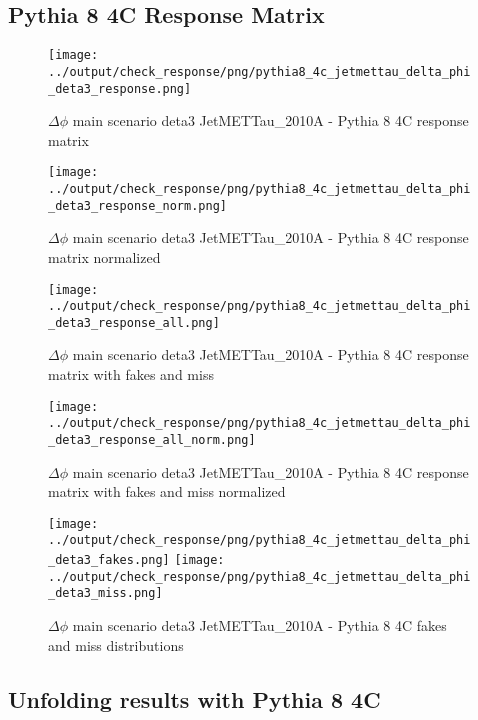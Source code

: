\documentclass[11pt]{book}
\begin{document}
\clearpage
\subsection{Pythia 8 4C Response Matrix}


\begin{figure}[ht]
\centering
\texttt{[image: ../output/check\_response/png/pythia8\_4c\_jetmettau\_delta\_phi\_deta3\_response.png]}
\caption{$\Delta\phi$ main scenario deta3 JetMETTau\_2010A - Pythia 8 4C response matrix}
\label{p8_jetmettau_delta_phi_deta3_response}
\end{figure}

\begin{figure}[ht]
\centering
\texttt{[image: ../output/check\_response/png/pythia8\_4c\_jetmettau\_delta\_phi\_deta3\_response\_norm.png]}
\caption{$\Delta\phi$ main scenario deta3 JetMETTau\_2010A - Pythia 8 4C response matrix normalized}
\label{p8_jetmettau_delta_phi_deta3_response_norm}
\end{figure}

\begin{figure}[ht]
\centering
\texttt{[image: ../output/check\_response/png/pythia8\_4c\_jetmettau\_delta\_phi\_deta3\_response\_all.png]}
\caption{$\Delta\phi$ main scenario deta3 JetMETTau\_2010A - Pythia 8 4C response matrix with fakes and miss}
\label{p8_jetmettau_delta_phi_deta3_response_all}
\end{figure}

\begin{figure}[ht]
\centering
\texttt{[image: ../output/check\_response/png/pythia8\_4c\_jetmettau\_delta\_phi\_deta3\_response\_all\_norm.png]}
\caption{$\Delta\phi$ main scenario deta3 JetMETTau\_2010A - Pythia 8 4C response matrix with fakes and miss normalized}
\label{p8_jetmettau_delta_phi_deta3_response_all_norm}
\end{figure}

\begin{figure}[ht]
\centering
\texttt{[image: ../output/check\_response/png/pythia8\_4c\_jetmettau\_delta\_phi\_deta3\_fakes.png]}
\texttt{[image: ../output/check\_response/png/pythia8\_4c\_jetmettau\_delta\_phi\_deta3\_miss.png]}
\caption{$\Delta\phi$ main scenario deta3 JetMETTau\_2010A - Pythia 8 4C fakes and miss distributions}
\label{p8_jetmettau_delta_phi_deta3_fakesmiss}
\end{figure}


\clearpage
\subsection{Unfolding results with Pythia 8 4C}
\end{document}
